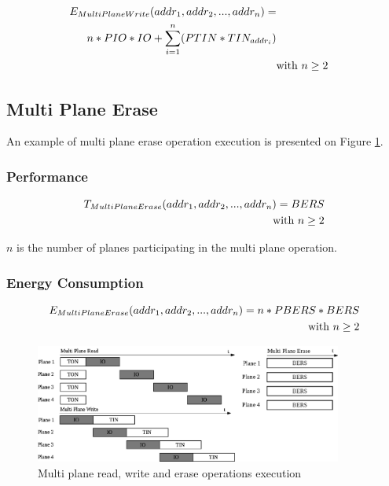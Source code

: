 \documentclass[oneside]{memoir}
\begin{document}
\begin{align} 
E_{MultiPlaneWrite}(addr_1, addr_2, ... , addr_n) = 
\notag\\n*PIO*IO + \sum\limits_{i=1}^{n} (PTIN*TIN_{addr_i})
\notag\\&\text{with } n \ge 2
\end{align}

\subsection{Multi Plane Erase}

An example of multi plane erase operation execution is presented on Figure \ref{fig:mprmpwmpe}.

\subsubsection{Performance}

\begin{align} 
T_{MultiPlaneErase}(addr_1, addr_2, ... , addr_n) = BERS
\notag\\\text{with } n \ge 2
\end{align}

$n$ is the number of planes participating in the multi plane operation.

\subsubsection{Energy Consumption}

\begin{align}
E_{MultiPlaneErase}(addr_1, addr_2, ... , addr_n) = n*PBERS*BERS
\notag\\\text{with } n \ge 2
\end{align}

\begin{figure}
  \center
  \includegraphics[width=0.9\textwidth]{Includes/MultiPlaneReadWriteErase.png}
  \caption{Multi plane read, write and erase operations execution}
  \label{fig:mprmpwmpe}
\end{figure}
\end{document}
